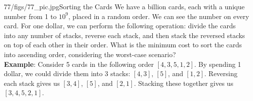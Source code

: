 \begin{problem}{77/figs/77_pic.jpg}{Sorting the Cards} We have a billion cards, each with a unique number from 1 to $10^9$, placed in a random order. We can see the number on every card. For one dollar, we can perform the following operation: divide the cards into any number of stacks, reverse each stack, and then stack the reversed stacks on top of each other in their order. What is the minimum cost to sort the cards into ascending order, considering the worst-case scenario?\\[0.2cm]
	
\textbf{Example}: Consider 5 cards in the following order $[4,3,5,1,2]$. By spending 1 dollar, we could divide them into 3 stacks: $[4,3]$, $[5]$, and $[1,2]$. Reversing each stack gives us $[3,4]$, $[5]$, and $[2, 1]$. Stacking these together gives us  $[3,4,5,2,1]$.
\end{problem}
